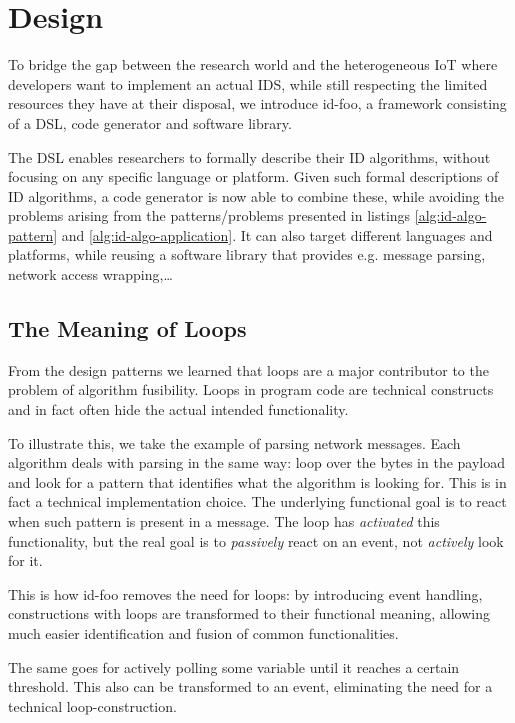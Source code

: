 \documentclass[conference]{IEEEtran}
\newcommand{\NAME}{id-foo\xspace}
\begin{document}
\section{Design}
\label{design}

To bridge the gap between the research world and the heterogeneous IoT where
developers want to implement an actual IDS, while still respecting the limited
resources they have at their disposal, we introduce \NAME, a framework
consisting of a DSL, code generator and software library.

The DSL enables researchers to formally describe their ID algorithms, without
focusing on any specific language or platform. Given such formal descriptions
of ID algorithms, a code generator is now able to combine these, while avoiding
the problems arising from the patterns/problems presented in listings
\ref{alg:id-algo-pattern} and \ref{alg:id-algo-application}. It can also target
different languages and platforms, while reusing a software library that
provides e.g. message parsing, network access wrapping,\dots

\subsection*{The Meaning of Loops}

From the design patterns we learned that loops are a major contributor to the
problem of algorithm fusibility. Loops in program code are technical constructs
and in fact often hide the actual intended functionality.

To illustrate this, we take the example of parsing network messages. Each
algorithm deals with parsing in the same way: loop over the bytes in the
payload and look for a pattern that identifies what the algorithm is looking
for. This is in fact a technical implementation choice. The underlying
functional goal is to react when such pattern is present in a message. The loop
has \emph{activated} this functionality, but the real goal is to
\emph{passively} react on an event, not \emph{actively} look for it.

This is how \NAME removes the need for loops: by introducing event handling,
constructions with loops are transformed to their functional meaning, allowing
much easier identification and fusion of common functionalities.

The same goes for actively polling some variable until it reaches a certain
threshold. This also can be transformed to an event, eliminating the need for a
technical loop-construction.
\end{document}
